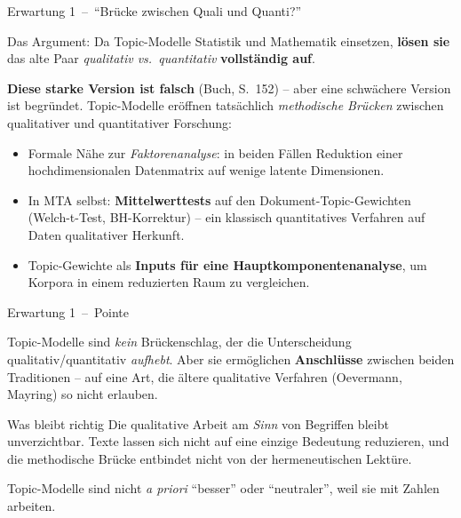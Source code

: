 \documentclass[aspectratio=169,11pt]{beamer}
\newcommand{\mdash}{\,{\monodash–}\,}
\let\oldemph\emph
\renewcommand{\emph}[1]{{\color{solCyan}\oldemph{#1}}}
\let\oldtextbf\textbf
\renewcommand{\textbf}[1]{{\color{solBase3}\oldtextbf{#1}}}
\begin{document}
\begin{frame}{Erwartung 1 \mdash{} \enquote{Brücke zwischen Quali und Quanti?}}

  Das Argument: Da Topic-Modelle Statistik und Mathematik einsetzen,
  \textbf{lösen sie} das alte Paar \emph{qualitativ vs.\ quantitativ}
  \textbf{vollständig auf}.

  \vfill
  \textbf{Diese starke Version ist falsch} (Buch, S.~152) – aber eine
  schwächere Version ist begründet. Topic-Modelle eröffnen tatsächlich
  \emph{methodische Brücken} zwischen qualitativer und quantitativer
  Forschung:
  \begin{itemize}
    \item Formale Nähe zur \emph{Faktorenanalyse}: in beiden Fällen
          Reduktion einer hochdimensionalen Datenmatrix auf wenige
          latente Dimensionen.
    \vfill
    \item In MTA selbst: \textbf{Mittelwerttests} auf den
          Dokument-Topic-Gewichten (Welch-t-Test, BH-Korrektur) –
          ein klassisch quantitatives Verfahren auf Daten qualitativer
          Herkunft.
    \vfill
    \item Topic-Gewichte als \textbf{Inputs für eine
          Hauptkomponentenanalyse}, um Korpora in einem reduzierten
          Raum zu vergleichen.
  \end{itemize}

\end{frame}

\begin{frame}{Erwartung 1 \mdash{} Pointe}

  Topic-Modelle sind \emph{kein} Brückenschlag, der die Unterscheidung
  qualitativ/quantitativ \emph{aufhebt}. Aber sie ermöglichen
  \textbf{Anschlüsse} zwischen beiden Traditionen – auf eine Art, die
  ältere qualitative Verfahren (Oevermann, Mayring) so nicht erlauben.

  \vfill
  \begin{block}{Was bleibt richtig}
    Die qualitative Arbeit am \emph{Sinn} von Begriffen bleibt
    unverzichtbar. Texte lassen sich nicht auf eine einzige Bedeutung
    reduzieren, und die methodische Brücke entbindet nicht von der
    hermeneutischen Lektüre.

    \medskip
    Topic-Modelle sind nicht \emph{a priori} \enquote{besser} oder
    \enquote{neutraler}, weil sie mit Zahlen arbeiten.
  \end{block}

\end{frame}
\end{document}
